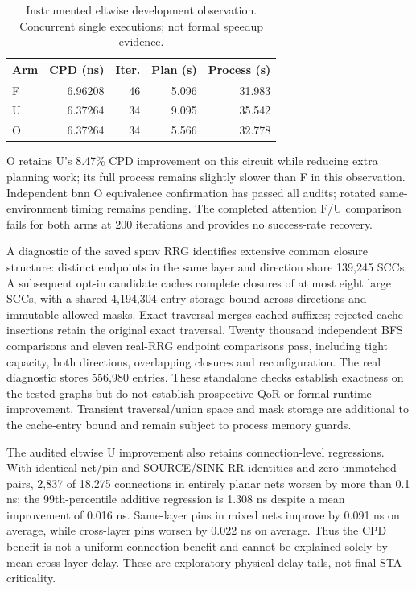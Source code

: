 \documentclass[conference,10pt]{IEEEtran}
\begin{document}
\begin{table}[t]
\centering\caption{Instrumented eltwise development observation. Concurrent single executions; not formal speedup evidence.}
\begin{tabular}{lrrrr}
\hline
Arm & CPD (ns) & Iter. & Plan (s) & Process (s)\\
\hline
F & 6.96208 & 46 & 5.096 & 31.983\\
U & 6.37264 & 34 & 9.095 & 35.542\\
O & 6.37264 & 34 & 5.566 & 32.778\\
\hline
\end{tabular}
\end{table}
O retains U's 8.47\% CPD improvement on this circuit while reducing extra planning work; its full process remains slightly slower than F in this observation. Independent bnn O equivalence confirmation has passed all audits; rotated same-environment timing remains pending. The completed attention F/U comparison fails for both arms at 200 iterations and provides no success-rate recovery.

A diagnostic of the saved spmv RRG identifies extensive common closure structure: distinct endpoints in the same layer and direction share 139,245 SCCs. A subsequent opt-in candidate caches complete closures of at most eight large SCCs, with a shared 4,194,304-entry storage bound across directions and immutable allowed masks. Exact traversal merges cached suffixes; rejected cache insertions retain the original exact traversal. Twenty thousand independent BFS comparisons and eleven real-RRG endpoint comparisons pass, including tight capacity, both directions, overlapping closures and reconfiguration. The real diagnostic stores 556,980 entries. These standalone checks establish exactness on the tested graphs but do not establish prospective QoR or formal runtime improvement. Transient traversal/union space and mask storage are additional to the cache-entry bound and remain subject to process memory guards.

The audited eltwise U improvement also retains connection-level regressions. With identical net/pin and SOURCE/SINK RR identities and zero unmatched pairs, 2,837 of 18,275 connections in entirely planar nets worsen by more than 0.1 ns; the 99th-percentile additive regression is 1.308 ns despite a mean improvement of 0.016 ns. Same-layer pins in mixed nets improve by 0.091 ns on average, while cross-layer pins worsen by 0.022 ns on average. Thus the CPD benefit is not a uniform connection benefit and cannot be explained solely by mean cross-layer delay. These are exploratory physical-delay tails, not final STA criticality.
\end{document}
